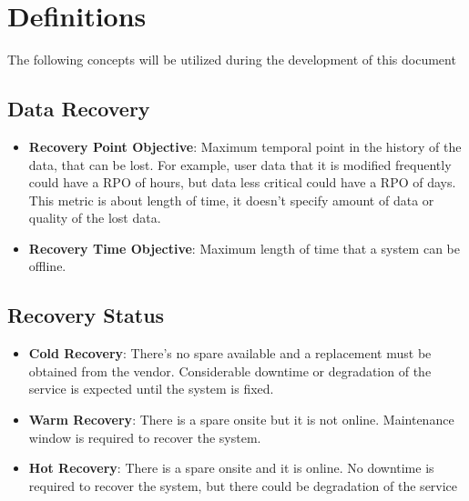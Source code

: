 \section{Definitions}

The following concepts will be utilized during the development of this document

\subsection{Data Recovery}

\begin{itemize}
    \item \textbf{Recovery Point Objective}: Maximum temporal point in the history of the data, that can be lost. For example, user data that it is modified frequently could have a RPO of hours, but data less critical could have a RPO of days. 
    This metric is about length of time, it doesn't specify amount of data or quality of the lost data.
    
    \item \textbf{Recovery Time Objective}: Maximum length of time that a system can be offline. 
  \end{itemize}


\subsection{Recovery Status}

    \begin{itemize}
        \item \textbf{Cold Recovery}: There's no spare available and a replacement must be obtained from the vendor. Considerable downtime or degradation of the service is expected until the system is fixed.
        \item \textbf{Warm Recovery}: There is a spare onsite but it is not online. Maintenance window is required to recover the system.
        \item \textbf{Hot Recovery}: There is a spare onsite and it is online. No downtime is required to recover the system, but there could be degradation of the service
    \end{itemize}

